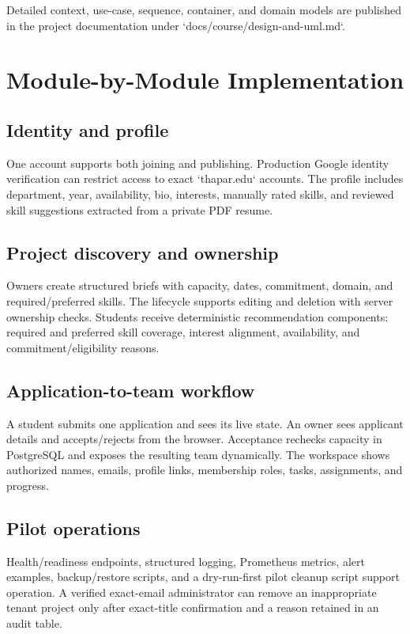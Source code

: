 \documentclass[11pt,a4paper]{article}
\begin{document}
Detailed context, use-case, sequence, container, and domain models are published in the project documentation under `docs/course/design-and-uml.md`.

\section{Module-by-Module Implementation}

\subsection{Identity and profile}

One account supports both joining and publishing. Production Google identity verification can restrict access to exact `thapar.edu` accounts. The profile includes department, year, availability, bio, interests, manually rated skills, and reviewed skill suggestions extracted from a private PDF resume.

\subsection{Project discovery and ownership}

Owners create structured briefs with capacity, dates, commitment, domain, and required/preferred skills. The lifecycle supports editing and deletion with server ownership checks. Students receive deterministic recommendation components: required and preferred skill coverage, interest alignment, availability, and commitment/eligibility reasons.

\subsection{Application-to-team workflow}

A student submits one application and sees its live state. An owner sees applicant details and accepts/rejects from the browser. Acceptance rechecks capacity in PostgreSQL and exposes the resulting team dynamically. The workspace shows authorized names, emails, profile links, membership roles, tasks, assignments, and progress.

\subsection{Pilot operations}

Health/readiness endpoints, structured logging, Prometheus metrics, alert examples, backup/restore scripts, and a dry-run-first pilot cleanup script support operation. A verified exact-email administrator can remove an inappropriate tenant project only after exact-title confirmation and a reason retained in an audit table.
\end{document}
